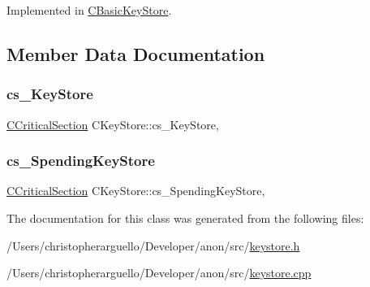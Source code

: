 Implemented in \mbox{\hyperlink{class_c_basic_key_store_a20c0eccf943d6d16e24c6e2fb63fb527}{C\+Basic\+Key\+Store}}.



\subsection{Member Data Documentation}
\mbox{\label{class_c_key_store_a386524ff4a00959b81c195cb39fe307d}} 
\subsubsection{\texorpdfstring{cs\+\_\+\+Key\+Store}{cs\_KeyStore}}
{\footnotesize\ttfamily \mbox{\hyperlink{sync_8h_a37a4692b2d517f2843655ca11af7668a}{C\+Critical\+Section}} C\+Key\+Store\+::cs\+\_\+\+Key\+Store\hspace{0.3cm}{\ttfamily [mutable]}, {\ttfamily [protected]}}

\mbox{\label{class_c_key_store_ac81106dc4a3f71d6c1781bfd10fb6589}} 
\subsubsection{\texorpdfstring{cs\+\_\+\+Spending\+Key\+Store}{cs\_SpendingKeyStore}}
{\footnotesize\ttfamily \mbox{\hyperlink{sync_8h_a37a4692b2d517f2843655ca11af7668a}{C\+Critical\+Section}} C\+Key\+Store\+::cs\+\_\+\+Spending\+Key\+Store\hspace{0.3cm}{\ttfamily [mutable]}, {\ttfamily [protected]}}



The documentation for this class was generated from the following files\+:\begin{DoxyCompactItemize}
\item 
/\+Users/christopherarguello/\+Developer/anon/src/\mbox{\hyperlink{keystore_8h}{keystore.\+h}}\item 
/\+Users/christopherarguello/\+Developer/anon/src/\mbox{\hyperlink{keystore_8cpp}{keystore.\+cpp}}\end{DoxyCompactItemize}
